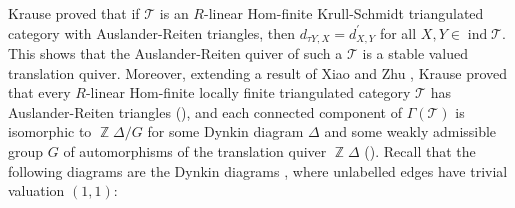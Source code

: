 \documentclass[12pt]{amsart}
\numberwithin{equation}{subsection}
\theoremstyle{plain}
\theoremstyle{definition}
\newcommand{\ind}{\operatorname{ind}}
\newcommand{\Z}{\operatorname{\mathbb{Z}}\nolimits}
\newcommand{\G}{\Gamma}
\newcommand{\T}{\mathcal{T}}
\begin{document}
Krause \cite[Lemma A.12]{Krause_2012} proved that if $\T$ is an $R$-linear Hom-finite Krull-Schmidt triangulated category with Auslander-Reiten triangles, then $d_{\tau Y, X} = d_{X, Y}^\prime$ for all $X, Y\in\ind\T$.
This shows that the Auslander-Reiten quiver of such a $\T$ is a stable valued translation quiver.
Moreover, extending a result of Xiao and Zhu \cite[Theorem 2.3.5]{Xiao-Zhu_2005}, Krause proved that every $R$-linear Hom-finite locally finite triangulated category $\T$ has Auslander-Reiten triangles (\cite[Corollary 3.2]{Krause_2012}), and each connected component of $\G(\T)$ is isomorphic to $\Z\Delta/G$ for some Dynkin diagram $\Delta$ and some weakly admissible group $G$ of automorphisms of the translation quiver $\Z\Delta$ (\cite[Theorem 3.5]{Krause_2012}). 
Recall that the following diagrams are the Dynkin diagrams \cite{Happel-Preiser-Ringel_1980}, where unlabelled edges have trivial valuation $(1,1)$:
\end{document}
